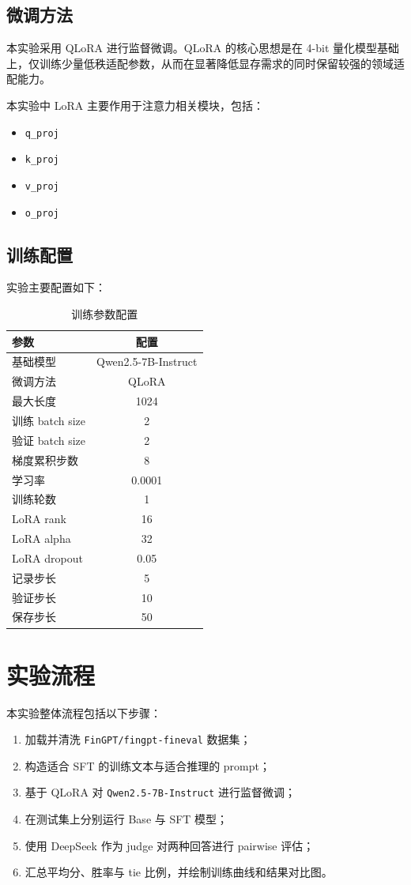 \documentclass[UTF8,a4paper,12pt]{ctexart}
\begin{document}
\subsection{微调方法}
本实验采用 QLoRA 进行监督微调。QLoRA 的核心思想是在 4-bit 量化模型基础上，仅训练少量低秩适配参数，从而在显著降低显存需求的同时保留较强的领域适配能力。

本实验中 LoRA 主要作用于注意力相关模块，包括：
\begin{itemize}
    \item \texttt{q\_proj}
    \item \texttt{k\_proj}
    \item \texttt{v\_proj}
    \item \texttt{o\_proj}
\end{itemize}

\subsection{训练配置}
实验主要配置如下：

\begin{table}[H]
\centering
\caption{训练参数配置}
\begin{tabular}{lc}
\toprule
参数 & 配置 \\
\midrule
基础模型 & Qwen2.5-7B-Instruct \\
微调方法 & QLoRA \\
最大长度 & 1024 \\
训练 batch size & 2 \\
验证 batch size & 2 \\
梯度累积步数 & 8 \\
学习率 & 0.0001 \\
训练轮数 & 1 \\
LoRA rank & 16 \\
LoRA alpha & 32 \\
LoRA dropout & 0.05 \\
记录步长 & 5 \\
验证步长 & 10 \\
保存步长 & 50 \\
\bottomrule
\end{tabular}
\end{table}

\section{实验流程}
本实验整体流程包括以下步骤：

\begin{enumerate}[leftmargin=2em]
    \item 加载并清洗 \texttt{FinGPT/fingpt-fineval} 数据集；
    \item 构造适合 SFT 的训练文本与适合推理的 prompt；
    \item 基于 QLoRA 对 \texttt{Qwen2.5-7B-Instruct} 进行监督微调；
    \item 在测试集上分别运行 Base 与 SFT 模型；
    \item 使用 DeepSeek 作为 judge 对两种回答进行 pairwise 评估；
    \item 汇总平均分、胜率与 tie 比例，并绘制训练曲线和结果对比图。
\end{enumerate}
\end{document}
